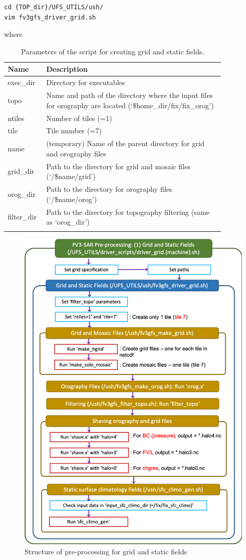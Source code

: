 \documentclass[11pt,fleqn]{report}              %
\begin{document}
\lstset{language=bash}   
\begin{lstlisting}[frame=trBL]
cd {TOP_dir}/UFS_UTILS/ush/
vim fv3gfs_driver_grid.sh
\end{lstlisting}
where
{
\fontsize{10}{12}\selectfont
\begin{longtable}{p{0.1\linewidth} | p{0.74\linewidth} }
\hline
\hline
 Name & Description \\
\hline
 exec\_dir & Directory for executables \\
 topo & Name and path of the directory where the input files for orography are located (`\$home\_dir/fix/fix\_orog') \\
 ntiles & Number of tiles (=1) \\
 tile & Tile number (=7) \\
 name & (temporary) Name of the parent directory for grid and orography files \\
 grid\_dir & Path to the directory for grid and mosaic files (`/\$name/grid') \\
 orog\_dir & Path to the directory for orography files (`/\$name/orog') \\
 filter\_dir & Path to the directory for topography filtering (same as `orog\_dir')\\
\hline
\caption{Parameters of the script for creating grid and static fields.}
\label{table:var_gridgen}
\end{longtable}
}

\begin{figure}[H]
  \centering
  \includegraphics[width=0.68\linewidth]{Fv3regional_pre1.png}
  \caption{Structure of pre-processing for grid and static fields}
  \label{fig:sar_pre1}
\end{figure}
\end{document}
